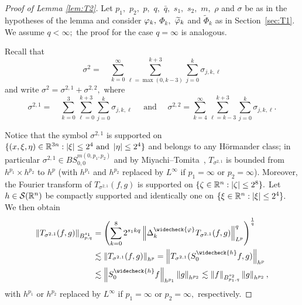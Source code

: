 \begin{proof}[Proof of Lemma \ref{lem:T2}]   Let $p_1,$ $p_2,$ $p,$ $q,$ $\bar{q},$ $s_1,$ $s_2,$ $m,$ $\rho$ and $\sigma$ be as in the hypotheses of the lemma and consider $\varphi_k,$ $\Phi_k,$ $\widetilde{\varphi}_k$ and $\widetilde{\Phi}_k$ as in Section~\ref{sec:T1}. We assume $q<\infty;$ the proof for the case $q=\infty$ is analogous.

Recall that
\[
\sigma^2= \quad \sum\limits_{k=0}^\infty  \sum\limits_{\ell =\max(0,k-3)}^{k+3} \sum\limits_{j=0}^k \sigma_{j,k,\ell}
\]
and write $\sigma^2=\sigma^{2,1}+\sigma^{2,2},$ where 
\[
\sigma^{2,1}= \quad \sum\limits_{k=0}^{3}  \sum\limits_{\ell =0}^{k+3} \sum\limits_{j=0}^k \sigma_{j,k,\ell}  
\quad \text{ and }\quad  \sigma^{2,2}= \sum\limits_{k=4}^\infty  \sum\limits_{\ell =k-3}^{k+3} \sum\limits_{j=0}^k \sigma_{j,k,\ell}.
\]

Notice that the symbol $\sigma^{2,1}$ is supported on $\{(x,\xi,\eta)\in\mathbb{R}^{3n}: \left\vert \xi \right\vert\le 2^{4} \text{ and } \left\vert \eta \right\vert\le2^{4}\}$ and belongs to any H\"ormander class; in particular $\sigma^{2,1}\in BS^{m(0,p_1,p_2)}_{0,0}$ and by Miyachi--Tomita~\cite[Theorem 1.1]{MR3179688}, $T_{\sigma^{2,1}}$ is bounded from $h^{p_1}\times h^{p_2}$ to $h^{p}$ (with $h^{p_1}$ and $h^{p_2}$ replaced by $L^\infty$ if $p_1=\infty$ or $p_2=\infty$). Moreover, the Fourier transform of $T_{\sigma^{2,1}}(f,g)$ is supported on $\{\zeta\in{{\mathbb R}^n}: \left\vert \zeta \right\vert\le2^{8}\}.$ Let $h\in{\mathcal{S}}({{\mathbb R}^n})$  be compactly supported and  identically one on $\{\xi\in{{\mathbb R}^n}:\left\vert \xi \right\vert\le 2^{4}\}.$ We then obtain
\begin{align*}
\norm{T_{\sigma^{2,1}}(f,g)}{\ibes{p}{s_1}{q}}&=\left(\sum_{k=0}^{8}2^{s_1kq}\norm{\Delta^{\widecheck{{\varphi}}}_k T_{\sigma^{2,1}}(f,g)}{L^p}^q\right)^{\frac{1}{q}}\\
&\lesssim \norm{T_{\sigma^{2,1}}(f,g)}{h^p}=\norm{T_{\sigma^{2,1}}(S^{\widecheck{h}}_0 f,g)}{h^p}\\
&\lesssim \norm{S^{\widecheck{h}}_0  f}{h^{p_1}}\norm{g}{h^{p_2}}\lesssim \norm{f}{\ibes{p_1}{s_2}{q}}\norm{g}{h^{p_2}},
\end{align*}
with $h^{p_1}$ or $h^{p_2}$ replaced by $L^\infty$ if $p_1=\infty$ or $p_2=\infty,$ respectively.



\end{proof}
